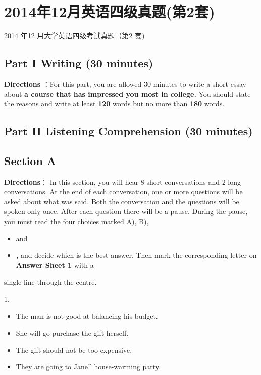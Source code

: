\documentclass[UTF8,11pt]{ctexart}
\begin{document}
\section*{2014年12月英语四级真题(第2套)}
2014 年12 月大学英语四级考试真题（第2 套)


\subsection*{Part I Writing (30 minutes)}


\textbf{Directions} ：For this part, you are allowed 30 minutes to write a short essay about\textbf{ a course that has impressed you most in} \textbf{college.} You should state the reasons and write at least\textbf{ 120} words but no more than\textbf{ 180} words.


\subsection*{Part II Listening Comprehension (30 minutes)}


\subsection*{Section A}


\textbf{Directions}： In this section\textbf{,} you will hear 8 short conversations and 2 long conversations. At the end of each conversation, one or more questions will be asked about what was said. Both the conversation and the questions will be spoken only once. After each question there will be a pause. During the pause, you must read the four choices marked A), B),


\begin{itemize}[leftmargin=2em,itemsep=.2em,topsep=.4em]\item[C.] and
\item[D.] \textbf{,} and decide which is the best answer. Then mark the corresponding letter on\textbf{ Answer Sheet 1} with a
\end{itemize}

single line through the centre.


1.


\begin{itemize}[leftmargin=2em,itemsep=.2em,topsep=.4em]\item[A.] The man is not good at balancing his budget.
\item[B.] She will go purchase the gift herself.
\item[C.] The gift should not be too expensive.
\item[D.] They are going to Jane\textasciicircum{} house-warming party.
\end{itemize}
\end{document}
